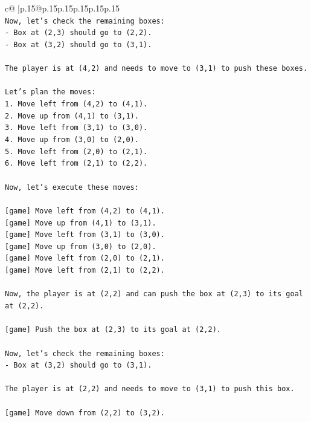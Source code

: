 \documentclass{article}
\begin{document}
{\begin{supertabular}{c@{$\;$}|p{.15\linewidth}@{}p{.15\linewidth}p{.15\linewidth}p{.15\linewidth}p{.15\linewidth}p{.15\linewidth}}
{{{\\ 
\texttt{Now, let's check the remaining boxes:} \\
\texttt{{-} Box at (2,3) should go to (2,2).} \\
\texttt{{-} Box at (3,2) should go to (3,1).} \\
\\ 
\texttt{The player is at (4,2) and needs to move to (3,1) to push these boxes.} \\
\\ 
\texttt{Let's plan the moves:} \\
\texttt{1. Move left from (4,2) to (4,1).} \\
\texttt{2. Move up from (4,1) to (3,1).} \\
\texttt{3. Move left from (3,1) to (3,0).} \\
\texttt{4. Move up from (3,0) to (2,0).} \\
\texttt{5. Move left from (2,0) to (2,1).} \\
\texttt{6. Move left from (2,1) to (2,2).} \\
\\ 
\texttt{Now, let's execute these moves:} \\
\\ 
\texttt{{[}game{]} Move left from (4,2) to (4,1).} \\
\texttt{{[}game{]} Move up from (4,1) to (3,1).} \\
\texttt{{[}game{]} Move left from (3,1) to (3,0).} \\
\texttt{{[}game{]} Move up from (3,0) to (2,0).} \\
\texttt{{[}game{]} Move left from (2,0) to (2,1).} \\
\texttt{{[}game{]} Move left from (2,1) to (2,2).} \\
\\ 
\texttt{Now, the player is at (2,2) and can push the box at (2,3) to its goal at (2,2).} \\
\\ 
\texttt{{[}game{]} Push the box at (2,3) to its goal at (2,2).} \\
\\ 
\texttt{Now, let's check the remaining boxes:} \\
\texttt{{-} Box at (3,2) should go to (3,1).} \\
\\ 
\texttt{The player is at (2,2) and needs to move to (3,1) to push this box.} \\
\\ 
\texttt{{[}game{]} Move down from (2,2) to (3,2).} \\
}}}
\end{supertabular}}
\end{document}
